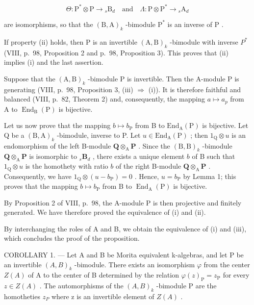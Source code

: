 \[
\Theta : \mathrm{P} ^ {*} \otimes \mathrm{P} \to {} _ {s} \mathrm{B} _ {d} \quad \text{and} \quad \Lambda : \mathrm{P} \otimes \mathrm{P} ^ {*} \to {} _ {s} \mathrm{A} _ {d}
\]

are isomorphisms, so that the \((\mathrm{B},\mathrm{A})_k\) -bimodule \(\mathrm{P}^*\) is an inverse of \(\mathrm{P}\) .

If property (ii) holds, then P is an invertible \((\mathrm{A},\mathrm{B})_{k}\) -bimodule with inverse \(P^{*}\) (VIII, p.~98, Proposition 2 and p.~98, Proposition 3). This proves that (ii) implies (i) and the last assertion.

Suppose that the \((\mathrm{A},\mathrm{B})_{k}\) -bimodule P is invertible. Then the A-module P is generating (VIII, p.~98, Proposition 3, (iii) \(\Rightarrow\) (i)). It is therefore faithful and balanced (VIII, p.~82, Theorem 2) and, consequently, the mapping \(a \mapsto a_{p}\) from A to \(\operatorname{End}_{\mathrm{B}}(\mathrm{P})\) is bijective.

Let us now prove that the mapping \(b \mapsto b_{\mathrm{P}}\) from B to \(\mathrm{End}_{\mathrm{A}}(\mathrm{P})\) is bijective. Let Q be a \((\mathrm{B},\mathrm{A})_k\) -bimodule, inverse to P. Let \(u \in \mathrm{End}_{\mathrm{A}}(\mathrm{P})\) ; then \(1_{\mathrm{Q}} \otimes u\) is an endomorphism of the left B-module \(\mathbf{Q} \otimes_{\mathrm{A}} \mathbf{P}\) . Since the \((\mathrm{B},\mathrm{B})_k\) -bimodule \(\mathbf{Q} \otimes_{\mathrm{A}} \mathbf{P}\) is isomorphic to \({}_s\mathbf{B}_d\) , there exists a unique element \(b\) of B such that \(1_{\mathrm{Q}} \otimes u\) is the homothety with ratio \(b\) of the right B-module \(\mathbf{Q} \otimes_{\mathrm{A}} \mathbf{P}\) . Consequently, we have \(1_{\mathrm{Q}} \otimes (u - b_{\mathrm{P}}) = 0\) . Hence, \(u = b_{\mathrm{P}}\) by Lemma 1; this proves that the mapping \(b \mapsto b_{\mathrm{P}}\) from B to \(\operatorname{End}_{\mathrm{A}}(\mathrm{P})\) is bijective.

By Proposition 2 of VIII, p.~98, the A-module P is then projective and finitely generated. We have therefore proved the equivalence of (i) and (ii).

By interchanging the roles of A and B, we obtain the equivalence of (i) and (iii), which concludes the proof of the proposition.

COROLLARY 1. --- Let A and B be Morita equivalent k-algebras, and let P be an invertible \((A,B)_{k}\) -bimodule. There exists an isomorphism \(\varphi\) from the center \(Z(A)\) of A to the center of B determined by the relation \(\varphi(z)_{\mathrm{P}} = z_{\mathrm{P}}\) for every \(z \in Z(A)\) . The automorphisms of the \((A,B)_{k}\) -bimodule P are the homotheties \(z_{P}\) where z is an invertible element of \(Z(A)\) .

